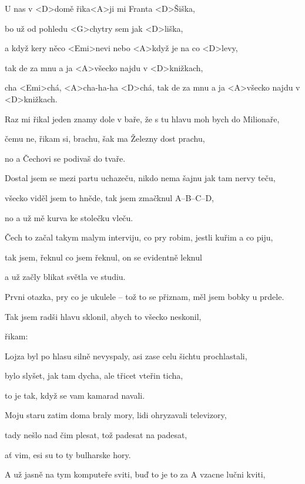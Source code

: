 


\zs
U nas v <D>domě řika<A>ji mi Franta <D>Šiška,

bo už od pohledu <G>chytry sem jak <D>liška,

a když kery něco <Emi>nevi nebo <A>když je na co <D>levy,

tak de za mnu a ja <A>všecko najdu v <D>knižkach,

cha <Emi>chá, <A>cha-ha-ha <D>chá, tak de za mnu a ja <A>všecko najdu v <D>knižkach.
\ks

\zs
Raz mi řikal jeden znamy dole v baře, že s tu hlavu moh bych do Milionaře,

čemu ne, řikam si, brachu, šak ma Železny dost prachu,

no a Čechovi se podivaš do tvaře.
\ks

\zs
Dostal jsem se mezi partu uchazeču, nikdo nema šajnu jak tam nervy teču,

všecko viděl jsem to hněde, tak jsem zmačknul A--B--C--D,

no a už mě kurva ke stolečku vleču.
\ks

\zs
Čech to začal takym malym interviju, co pry robim, jestli kuřim a co piju,

tak jsem, řeknul co jsem řeknul, on se evidentně leknul

a už začly blikat světla ve studiu.
\ks

\zs
Prvni otazka, pry co je ukulele -- tož to se přiznam, měl jsem bobky u prdele.

Tak jsem radši hlavu sklonil, abych to všecko neskonil,

řikam: 
\ks

\zs
Lojza byl po hlasu silně nevyspaly, asi zase celu šichtu prochlastali,

bylo slyšet, jak tam dycha, ale třicet vteřin ticha,

to je tak, když se vam kamarad navali.
\ks

\zs
Moju staru zatim doma braly mory, lidi ohryzavali televizory,

tady nešlo nad čim plesat, tož padesat na padesat,

ať vim, esi su to ty bulharske hory.
\ks

\zs
A už jasně na tym komputeře sviti, buď to je to za A vzacne lučni kviti,

